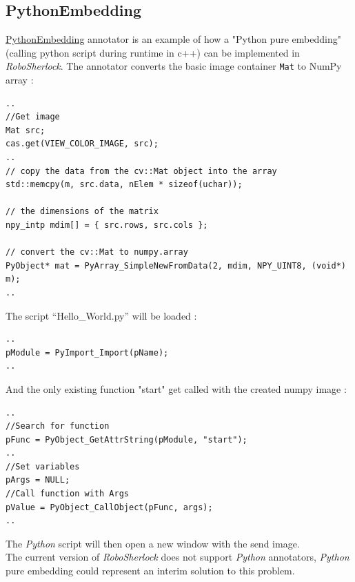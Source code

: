 \documentclass[main.tex]{subfiles}
\begin{document}
                \subsection{PythonEmbedding}
\href{https://github.com/SUTURO/suturo_perception/blob/Handcamera_tracking/rs_Athene/src/PythonEmbedding.cpp}{PythonEmbedding} annotator is an example of how a "Python pure embedding" (calling python script during runtime in c++) can be implemented in \textit{RoboSherlock}. The annotator converts the basic image container \texttt{Mat} to NumPy array : 
\begin{lstlisting}
..
//Get image
Mat src;
cas.get(VIEW_COLOR_IMAGE, src);
..
// copy the data from the cv::Mat object into the array
std::memcpy(m, src.data, nElem * sizeof(uchar));

// the dimensions of the matrix
npy_intp mdim[] = { src.rows, src.cols };
    
// convert the cv::Mat to numpy.array
PyObject* mat = PyArray_SimpleNewFromData(2, mdim, NPY_UINT8, (void*) m);
..
\end{lstlisting}

The script “Hello\_World.py” will be loaded :  

\begin{lstlisting}
..
pModule = PyImport_Import(pName);
..
\end{lstlisting}
And the only existing function "start" get called with the created numpy image : 
\begin{lstlisting}
..
//Search for function
pFunc = PyObject_GetAttrString(pModule, "start");
..
//Set variables
pArgs = NULL;
//Call function with Args
pValue = PyObject_CallObject(pFunc, args);
..
\end{lstlisting}
The \textit{Python} script will then open a new window with the send image.\\
The current version of \textit{RoboSherlock} does not support \textit{Python} annotators, \textit{Python} pure embedding could represent an interim solution to this problem.

\endgroup
\end{document}
